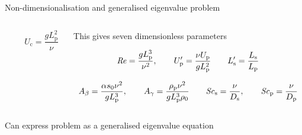 \documentclass[final]{beamer} %
\newcommand\Rey{\mbox{\textit{Re}}}  %
\newcommand\Sc{\mbox{\textit{Sc}}}  %
\begin{document}
\begin{frame}[t]
\begin{columns}[t]
\begin{column}{0.6\paperwidth}
\begin{block}{Non-dimensionalisation and generalised eigenvalue problem}
\begin{columns}[t]
\begin{column}{0.2\paperwidth}
\begin{columns}[t]
\begin{column}{0.11\paperwidth}
              \end{column}
          
              \begin{column}{0.1\paperwidth}
                \centering

                $$ U_{\text{c}} = \frac{g L_{\text{p}}^{2}}{\nu} $$

              \end{column}

            \end{columns}

          \end{column}

          \begin{column}{0.3\paperwidth}
            \centering This gives seven dimensionless parameters

            \vspace{-1cm}
        
            $$ \Rey = \frac{g L_{\text{p}}^{3}}{\nu^{2}}, \quad  \quad U_{\text{p}}' = \frac{\nu U_{\text{p}}}{g L_{\text{p}}^{2}} \quad \quad L_{\text{s}}' = \frac{L_{\text{s}}}{L_{\text{p}}}$$

            \vspace{-1cm}
        
            $$A_{\beta} = \frac{\alpha s_{0} \nu^{2}}{g L_{\text{p}}^{3}}, \quad  \quad A_{\gamma} = \frac{\rho_{\text{p}} \nu^{2}}{g L_{\text{p}}^{3} \rho_{0}} \quad \quad \Sc_{\text{s}} = \frac{\nu}{D_{\text{s}}},  \quad  \quad \Sc_{\text{p}} = \frac{\nu}{D_{\text{p}}} $$

          \end{column}
        \end{columns}

        \vspace{1cm}

        Can express problem as a generalised eigenvalue equation
        

\end{block}
\end{column}
\end{columns}
\end{frame}
\end{document}

